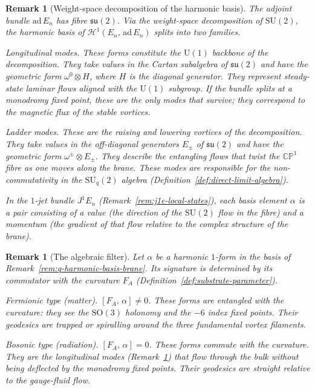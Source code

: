 \documentclass[12pt,a4paper]{report}
\newtheorem{remark}[theorem]{Remark}
\begin{document}
\begin{remark}[Weight-space decomposition of the harmonic basis]
\label{rem:weight-space-decomposition}
The adjoint bundle $\mathrm{ad}\, E_n$ has fibre $\mathfrak{su}(2)$.  Via the
weight-space decomposition of $\mathrm{SU}(2)$, the harmonic basis of
$\mathcal{H}^1(E_n,\, \mathrm{ad}\, E_n)$ splits into two families.

\emph{Longitudinal modes.}
These forms constitute the $\mathrm{U}(1)$ backbone of the decomposition.
They take values in the Cartan subalgebra of $\mathfrak{su}(2)$ and have the
geometric form $\omega^0 \otimes H$, where $H$ is the diagonal generator.
They represent steady-state laminar flows aligned with the $\mathrm{U}(1)$
subgroup.  If the bundle splits at a monodromy fixed point, these are the only
modes that survive; they correspond to the magnetic flux of the stable
vortices.

\emph{Ladder modes.}
These are the raising and lowering vortices of the decomposition.  They take
values in the off-diagonal generators $E_\pm$ of $\mathfrak{su}(2)$ and have
the geometric form $\omega^\pm \otimes E_\pm$.  They describe the entangling
flows that twist the $\mathbb{CP}^1$ fibre as one moves along the brane.
These modes are responsible for the non-commutativity in the
$\mathrm{SU}_q(2)$ algebra (Definition~\ref{def:direct-limit-algebra}).

In the $1$-jet bundle $J^1 E_n$
(Remark~\ref{rem:j1e-local-states}), each basis element $\alpha$ is a pair
consisting of a \emph{value} (the direction of the $\mathrm{SU}(2)$ flow in
the fibre) and a \emph{momentum} (the gradient of that flow relative to the
complex structure of the brane).
\end{remark}



\begin{remark}[The algebraic filter]
\label{rem:algebraic-filter}
Let $\alpha$ be a harmonic $1$-form in the basis of
Remark~\ref{rem:q-harmonic-basis-brane}.  Its \emph{signature} is determined
by its commutator with the curvature $F_A$
(Definition~\ref{def:substrate-parameter}).

\emph{Fermionic type (matter).}
$[F_A,\, \alpha] \neq 0$.  These forms are entangled with the curvature: they
see the $\mathrm{SO}(3)$ holonomy and the $-6$ index fixed points.  Their
geodesics are trapped or spiralling around the three fundamental vortex
filaments.

\emph{Bosonic type (radiation).}
$[F_A,\, \alpha] = 0$.  These forms commute with the curvature.  They are the
longitudinal modes (Remark~\ref{rem:weight-space-decomposition}) that flow
through the bulk without being deflected by the monodromy fixed points.  Their
geodesics are straight relative to the gauge-fluid flow.
\end{remark}
\end{document}
